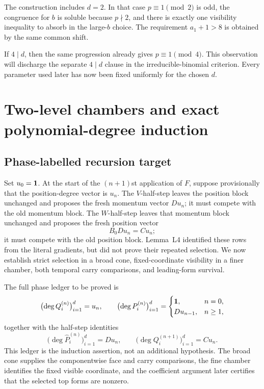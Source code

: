 \documentclass[11pt,letterpaper]{article}
\theoremstyle{plain}
\begin{document}
The construction includes $d=2$.  In that case $p\equiv1\pmod2$ is odd, the congruence for $b$ is soluble because $p\nmid2$, and there is exactly one visibility inequality to absorb in the large-$b$ choice.  The requirement $a_1+1>8$ is obtained by the same common shift.

If $4\mid d$, then the same progression already gives $p\equiv1\pmod4$.  This observation will discharge the separate $4\mid d$ clause in the irreducible-binomial criterion.  Every parameter used later has now been fixed uniformly for the chosen $d$.

\section{Two-level chambers and exact polynomial-degree induction}
\label{sec:degrees}

\subsection{Phase-labelled recursion target}

Set $u_0=\mathbf{1}$.  At the start of the $(n+1)$st application of $F$, suppose provisionally that the position-degree vector is $u_n$.  The $V$-half-step leaves the position block unchanged and proposes the fresh momentum vector $Du_n$; it must compete with the old momentum block.  The $W$-half-step leaves that momentum block unchanged and proposes the fresh position vector
\[
B_0Du_n=Cu_n;
\]
it must compete with the old position block.  Lemma~L4 identified these rows from the literal gradients, but did not prove their repeated selection.  We now establish strict selection in a broad cone, fixed-coordinate visibility in a finer chamber, both temporal carry comparisons, and leading-form survival.

The full phase ledger to be proved is
\[
\bigl(\deg Q_i^{(n)}\bigr)_{i=1}^d=u_n,
\qquad
\bigl(\deg P_i^{(n)}\bigr)_{i=1}^d=
\begin{cases}
\mathbf{1},&n=0,\\
Du_{n-1},&n\geq1,
\end{cases}
\]
together with the half-step identities
\[
\bigl(\deg\widehat P_i^{(n)}\bigr)_{i=1}^d=Du_n,
\qquad
\bigl(\deg Q_i^{(n+1)}\bigr)_{i=1}^d=Cu_n.
\]
This ledger is the induction assertion, not an additional hypothesis.  The broad cone supplies the componentwise face and carry comparisons, the fine chamber identifies the fixed visible coordinate, and the coefficient argument later certifies that the selected top forms are nonzero.
\end{document}
